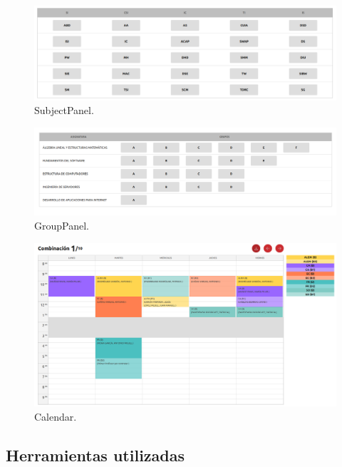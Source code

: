 \begin{figure}[H]
    \centering
    \includegraphics[width=1\textwidth]{./imagenes/subjects_panel.png}
    \caption{SubjectPanel.}
    \label{fig:subjectPanel}
\end{figure}

\begin{figure}[H]
    \centering
    \includegraphics[width=1\textwidth]{./imagenes/group_panel.png}
    \caption{GroupPanel.}
    \label{fig:groupPanel}
\end{figure}

\begin{figure}[H]
    \centering
    \includegraphics[width=1\textwidth]{./imagenes/calendar.png}
    \caption{Calendar.}
    \label{fig:calendar}
\end{figure}

\subsection{Herramientas utilizadas}

